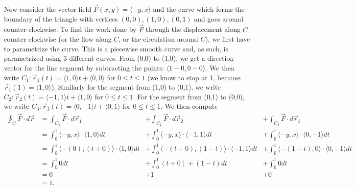 \begin{example}
%
Now consider the vector field {$\vec
  F(x,y)=\langle-y,x\rangle$} and the curve which forms the boundary of the
triangle with vertices $(0,0), (1,0), (0,1)$ and goes around
counter-clockwise. To find the work done by $\vec F$ through the
displacement along $C$ counter-clockwise (or the flow along $C$, or the circulation
around $C$), we first have to parametrize the curve.  This is a
piecewise smooth curve and, as such, is parametrized using 3 different
curves.  From (0,0) to (1,0), we get a direction vector for the line
segment by subtracting the points: $\langle1-0,0-0\rangle$. We then write
$C_1\colon\vec r_1(t) = \langle1,0\rangle t+\langle0,0\rangle$ for $0\leq t \leq 1$ (we know to stop at
1, because $\vec r_1(1)=\langle1,0\rangle$).  Similarly for the segment from (1,0)
to (0,1), we write $C_2\colon\vec r_2(t) = \langle-1,1\rangle t+\langle1,0\rangle$ for $0\leq t \leq
1$. For the segment from (0,1) to (0,0), we write $C_3\colon\vec r_3(t) =
\langle0,-1\rangle t+\langle0,1\rangle$ for $0\leq t \leq 1$. We then compute
$$\begin{array}{rlll}
  \oint_C \vec F\cdot d\vec r 
  &= \int_{C_1} \vec F\cdot d\vec r_1 &+ \int_{C_2} \vec F\cdot d\vec r_2 &+ \int_{C_3}
  \vec F\cdot d\vec r_3\\
  &= \int_0^1 \langle-y,x\rangle\cdot \langle1,0\rangle dt &+ \int_0^1
  \langle-y,x\rangle\cdot \langle-1,1\rangle dt &+ \int_0^1 \langle-y,x\rangle\cdot
  \langle0,-1\rangle dt\\
  &= \int_0^1 \langle-(0),(t+0)\rangle\cdot \langle1,0\rangle dt &+ \int_0^1
  \langle-(t+0),(1-t)\rangle\cdot \langle-1,1\rangle dt &+ \int_0^1
  \langle-(1-t),0\rangle\cdot \langle0,-1\rangle dt\\
  &= \int_0^1 0 dt &+ \int_0^1 (t+0)+(1-t)dt &+ \int_0^1 0 dt\\
  &= 0 &+ 1 &+ 0 \\
  &= 1.
\end{array}$$
\end{example}

